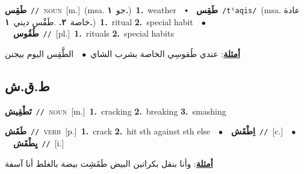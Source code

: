 \documentclass[10pt,a4paper,twoside]{article} %
\begin{document}
\begin{multicols}{2}
{\setlength\topsep{0pt}\textbf{\foreignlanguage{arabic}{طَقِس}}\ {\color{gray}\texttt{//}\color{black}}\ \textsc{noun}\ [m.]\ \color{gray}(msa. \foreignlanguage{arabic}{جو}~\foreignlanguage{arabic}{\textbf{١.}})\color{black}\ \textbf{1.}~weather\ \ $\smblkdiamond$\ \ \setlength\topsep{0pt}\textbf{\foreignlanguage{arabic}{طَقِس}}\ {\color{gray}\texttt{/tˤaqis/}\color{black}}\ \color{gray}(msa. \foreignlanguage{arabic}{عادة خاصة}~\foreignlanguage{arabic}{\textbf{٢.}}  .\foreignlanguage{arabic}{طَقْس ديني}~\foreignlanguage{arabic}{\textbf{١.}})\color{black}\ \textbf{1.}~ritual  \textbf{2.}~special habit\ \ $\bullet$\ \ \setlength\topsep{0pt}\textbf{\foreignlanguage{arabic}{طُقُوس}}\ {\color{gray}\texttt{//}\color{black}}\ [pl.]\ \textbf{1.}~rituals  \textbf{2.}~special habits\  \begin{flushright}\color{gray}\foreignlanguage{arabic}{\textbf{\underline{\foreignlanguage{arabic}{أمثلة}}}: عندي طُقوسِي الخاصة بشرب الشاي\ $\bullet$\ \  الطَّقِس اليوم بيجنن}\end{flushright}\color{black}} \vspace{2mm}

\vspace{-3mm}
\subsection*{\color{blue}\foreignlanguage{arabic}{ط.ق.ش}\color{blue}{}} 

{\setlength\topsep{0pt}\textbf{\foreignlanguage{arabic}{تَطْقِيش}}\ {\color{gray}\texttt{//}\color{black}}\ \textsc{noun}\ [m.]\ \textbf{1.}~cracking  \textbf{2.}~breaking  \textbf{3.}~smashing\ } \vspace{2mm}

{\setlength\topsep{0pt}\textbf{\foreignlanguage{arabic}{طَقَش}}\ {\color{gray}\texttt{//}\color{black}}\ \textsc{verb}\ [p.]\ \textbf{1.}~crack  \textbf{2.}~hit sth against sth else\ \ $\bullet$\ \ \setlength\topsep{0pt}\textbf{\foreignlanguage{arabic}{اِطْقَش}}\ {\color{gray}\texttt{//}\color{black}}\ [c.]\ \ $\bullet$\ \ \setlength\topsep{0pt}\textbf{\foreignlanguage{arabic}{يِطْقَش}}\ {\color{gray}\texttt{//}\color{black}}\ [i.]\  \begin{flushright}\color{gray}\foreignlanguage{arabic}{\textbf{\underline{\foreignlanguage{arabic}{أمثلة}}}: وأنا بنقل بكراتين البيض طَقَشِت بيضة بالغلط أنا آسفة}\end{flushright}\color{black}} \vspace{2mm}


\end{multicols}
\end{document}
